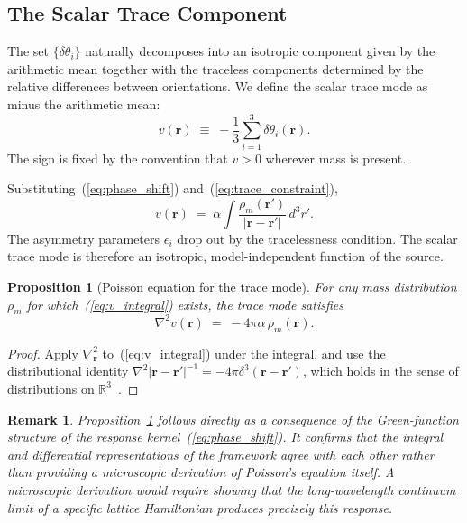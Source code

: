\documentclass[pdflatex,sn-mathphys-num]{sn-jnl}%
\theoremstyle{thmstyleone}%
\newtheorem{proposition}[theorem]{Proposition}
\theoremstyle{thmstyletwo}%
\newtheorem{remark}{Remark}%
\theoremstyle{thmstylethree}%
\begin{document}
\subsection{The Scalar Trace Component}

The set $\{\delta\theta_i\}$ naturally decomposes into an
isotropic component given by the arithmetic mean together
with the traceless components determined by the relative
differences between orientations. We define the scalar trace
mode as minus the arithmetic mean:
\begin{equation}
    v(\mathbf{r})
    \;\equiv\;
    -\frac{1}{3}\sum_{i=1}^{3}\delta\theta_i(\mathbf{r}).
    \label{eq:void_def}
\end{equation}
The sign is fixed by the convention that $v>0$ wherever mass
is present.

Substituting~(\ref{eq:phase_shift}) and~(\ref{eq:trace_constraint}),
\begin{equation}
    v(\mathbf{r})
    \;=\;
    \alpha\int
    \frac{\rho_m(\mathbf{r}')}{|\mathbf{r}-\mathbf{r}'|}
    \,d^3r'.
    \label{eq:v_integral}
\end{equation}
The asymmetry parameters $\epsilon_i$ drop out by the
tracelessness condition. The scalar trace mode is therefore
an isotropic, model-independent function of the source.

\begin{proposition}[Poisson equation for the trace mode]
\label{prop:poisson}
For any mass distribution $\rho_m$ for which~(\ref{eq:v_integral})
exists, the trace mode satisfies
\begin{equation}
    \nabla^2 v(\mathbf{r})
    \;=\;
    -4\pi\alpha\,\rho_m(\mathbf{r}).
    \label{eq:poisson}
\end{equation}
\end{proposition}

\begin{proof}
Apply $\nabla^2_{\mathbf{r}}$ to~(\ref{eq:v_integral}) under
the integral, and use the distributional identity
$\nabla^2|\mathbf{r}-\mathbf{r}'|^{-1}=-4\pi\delta^3
(\mathbf{r}-\mathbf{r}')$, which holds in the sense of
distributions on $\mathbb{R}^3$~\cite{Jackson1999,Evans2010}.
\end{proof}

\begin{remark}
\label{rem:poisson_is_kernel}
Proposition~\ref{prop:poisson} follows directly as a
consequence of the Green-function structure of the response
kernel~(\ref{eq:phase_shift}). It confirms that the integral
and differential representations of the framework agree with
each other rather than providing a microscopic derivation of
Poisson's equation itself. A microscopic derivation would
require showing that the long-wavelength continuum limit of a
specific lattice Hamiltonian produces precisely this response.
\end{remark}
\end{document}

